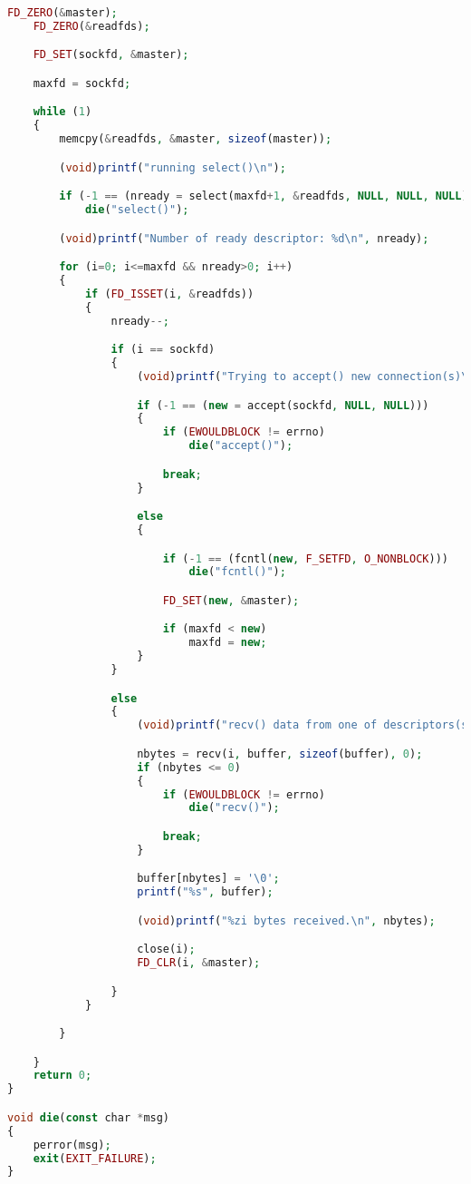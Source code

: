 \begin{lstlisting}[language=PHP]
    FD_ZERO(&master);
    FD_ZERO(&readfds);

    FD_SET(sockfd, &master);

    maxfd = sockfd;

    while (1)
    {
        memcpy(&readfds, &master, sizeof(master));

        (void)printf("running select()\n");

        if (-1 == (nready = select(maxfd+1, &readfds, NULL, NULL, NULL)))
            die("select()");

        (void)printf("Number of ready descriptor: %d\n", nready);

        for (i=0; i<=maxfd && nready>0; i++)
        {
            if (FD_ISSET(i, &readfds))
            {
                nready--;

                if (i == sockfd)
                {
                    (void)printf("Trying to accept() new connection(s)\n");

                    if (-1 == (new = accept(sockfd, NULL, NULL)))
                    {
                        if (EWOULDBLOCK != errno)
                            die("accept()");

                        break;
                    }

                    else
                    {

                        if (-1 == (fcntl(new, F_SETFD, O_NONBLOCK)))
                            die("fcntl()");

                        FD_SET(new, &master);

                        if (maxfd < new)
                            maxfd = new;
                    }
                }

                else
                {
                    (void)printf("recv() data from one of descriptors(s)\n");

                    nbytes = recv(i, buffer, sizeof(buffer), 0);
                    if (nbytes <= 0)
                    {
                        if (EWOULDBLOCK != errno)
                            die("recv()");

                        break;
                    }

                    buffer[nbytes] = '\0';
                    printf("%s", buffer);

                    (void)printf("%zi bytes received.\n", nbytes);

                    close(i);
                    FD_CLR(i, &master);

                }
            }

        }

    }
    return 0;
}

void die(const char *msg)
{
    perror(msg);
    exit(EXIT_FAILURE);
}
\end{lstlisting}




